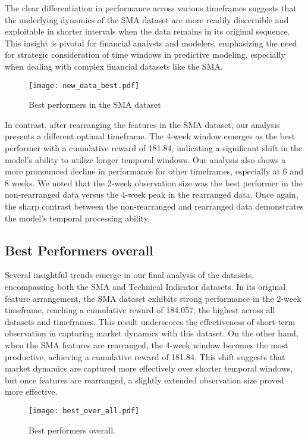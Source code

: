 The clear differentiation in performance across various timeframes suggests that the underlying dynamics of the SMA dataset are more readily discernible and exploitable in shorter intervals when the data remains in its original sequence. This insight is pivotal for financial analysts and modelers, emphasizing the need for strategic consideration of time windows in predictive modeling, especially when dealing with complex financial datasets like the SMA.
\begin{figure}[ht]
    \centering
    \texttt{[image: new\_data\_best.pdf]}
    \caption{Best performers in the SMA dataset }
    \label{fig:sma_data_best_performers}
\end{figure}

In contrast, after rearranging the features in the SMA dataset, our analysis presents a different optimal timeframe. The 4-week window emerges as the best performer with a cumulative reward of 181.84, indicating a significant shift in the model's ability to utilize longer temporal windows. Our analysis also shows a more pronounced decline in performance for other timeframes, especially at 6 and 8 weeks. We noted that the 2-week observation size was the best performer in the non-rearranged data versus the 4-week peak in the rearranged data. Once again, the sharp contrast between the non-rearranged and rearranged data demonstrates the model's temporal processing ability.

\subsection{Best Performers overall}
Several insightful trends emerge in our final analysis of the datasets, encompassing both the SMA and Technical Indicator datasets. In its original feature arrangement, the SMA dataset exhibits strong performance in the 2-week timeframe, reaching a cumulative reward of 184.057, the highest across all datasets and timeframes. This result underscores the effectiveness of short-term observation in capturing market dynamics with this dataset. On the other hand, when the SMA features are rearranged, the 4-week window becomes the most productive, achieving a cumulative reward of 181.84. This shift suggests that market dynamics are captured more effectively over shorter temporal windows, but once features are rearranged, a slightly extended observation size proved more effective.

\begin{figure}[ht]
    \centering
    \texttt{[image: best\_over\_all.pdf]}
    \caption{Best performers overall. }
    \label{fig:best_performers_overall}
\end{figure}

